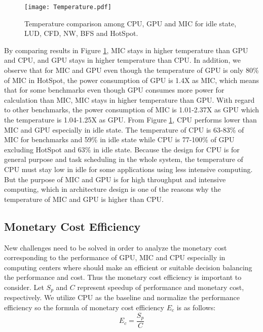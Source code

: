     \begin{figure}[h!]
  \centering
  \begin{minipage}{0.5\textwidth}
    \centering
   \centering
     \texttt{[image: Temperature.pdf]}    
\caption{Temperature comparison among CPU, GPU and MIC for idle state, LUD, CFD, NW, BFS and HotSpot.}
\label{fig:temperature}
\end{minipage}%
\end{figure}

By comparing results in Figure \ref{fig:temperature}, MIC stays in higher temperature than GPU and CPU, and GPU stays in higher temperature than CPU. In addition, we observe that for MIC and GPU even though the temperature of GPU is only 80\% of MIC in HotSpot, the power consumption of GPU is 1.4X as MIC, which means that for some benchmarks even though GPU consumes more power for calculation than MIC, MIC stays in higher temperature than GPU. With regard to other benchmarks, the power consumption of MIC is 1.01-2.37X as GPU which the temperature is 1.04-1.25X as GPU. From Figure \ref{fig:temperature}, CPU performs lower than MIC and GPU especially in idle state. The temperature of CPU is 63-83\% of MIC for benchmarks and 59\% in idle state while CPU is 77-100\% of GPU excluding HotSpot and 63\% in idle state. Because the design for CPU is for general purpose and task scheduling in the whole system, the temperature of CPU must stay low in idle for some applications using less intensive computing. But the purpose of MIC and GPU is for high throughput and intensive computing, which in architecture design is one of the reasons why the temperature of MIC and GPU is higher than CPU.



\subsection{Monetary Cost Efficiency} 
New challenges need to be solved in order to analyze the monetary cost corresponding to the performance of GPU, MIC and CPU especially in computing centers where should make an efficient or suitable decision balancing the performance and cost. Thus the monetary cost efficiency is important to consider. Let $S_{p}$ and $C$ represent speedup of performance and monetary cost, respectively. We utilize CPU as the baseline and normalize the performance efficiency so the formula of monetary cost efficiency $E_{c}$ is as follows:
\begin{equation}\label{equ:monetaryE}
  {E_{c}} = \frac{S_{p}}{C}
\end{equation}

